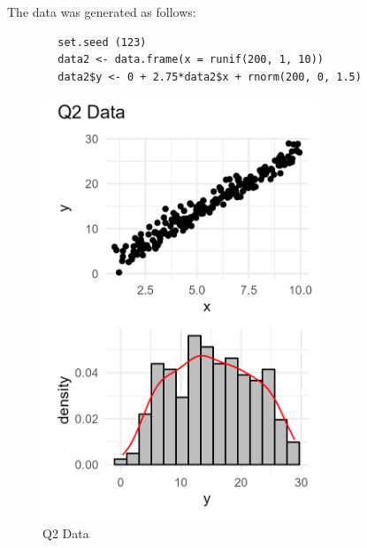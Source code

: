 \documentclass[12pt,letterpaper]{article}
\begin{document}
	The data was generated as follows:

	\begin{lstlisting}
		set.seed (123)
		data2 <- data.frame(x = runif(200, 1, 10))
		data2$y <- 0 + 2.75*data2$x + rnorm(200, 0, 1.5)

	\end{lstlisting}

  \begin{figure}[!htbp]
	  \includegraphics[width=0.75\textwidth]{graphics/q2_data.png}
	  \caption{Q2 Data}
	  \label{fig:mle:data}
	\end{figure}
\end{document}
